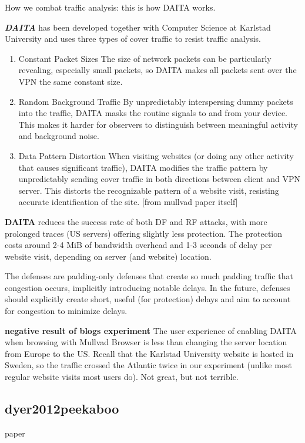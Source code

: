 How we combat traffic analysis: this is how DAITA works.

\textbf{\textit{DAITA}} has been developed together with Computer Science at Karlstad University and uses three types of cover traffic to resist traffic analysis.
\begin{enumerate}
    \item  Constant Packet Sizes
The size of network packets can be particularly revealing, especially small packets, so DAITA makes all packets sent over the VPN the same constant size.
    \item  Random Background Traffic
 By unpredictably interspersing dummy packets into the traffic, DAITA masks the routine signals to and from your device. This makes it harder for observers to distinguish between meaningful activity and background noise.
    \item  Data Pattern Distortion
When visiting websites (or doing any other activity that causes significant traffic), DAITA modifies the traffic pattern by unpredictably sending cover traffic in both directions between client and VPN server. This distorts the recognizable pattern of a website visit, resisting accurate identification of the site. [from mullvad paper itself]
\end{enumerate}

\textbf{DAITA} reduces the success rate of both DF and RF attacks, with more prolonged traces (US servers) offering slightly less protection. The protection costs around 2-4 MiB of bandwidth overhead and 1-3 seconds of delay per website visit, depending on server (and website) location.

The defenses are padding-only defenses that create so much padding traffic that congestion occurs, implicitly introducing notable delays. In the future, defenses should explicitly create short, useful (for protection) delays and aim to account for congestion to minimize delays.


\textbf{negative result of blogs experiment}
The user experience of enabling DAITA when browsing with Mullvad Browser is less than changing the server location from Europe to the US. Recall that the Karlstad University website is hosted in Sweden, so the traffic crossed the Atlantic twice in our experiment (unlike most regular website visits most users do). Not great, but not terrible.



\subsection{dyer2012peekaboo}
paper~\cite{dyer2012peekaboo}

